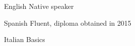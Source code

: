 


\begin{cvskills}


\cvskill
{English} %
{Native speaker} %


\cvskill
{Spanish} %
{Fluent, diploma obtained in 2015} %


\cvskill
{Italian} %
{Basics} %


\end{cvskills}